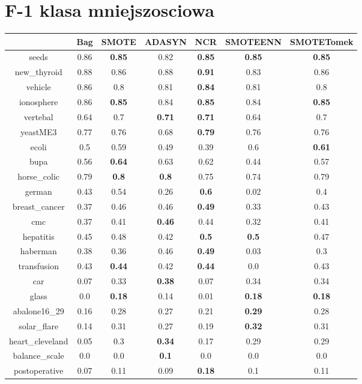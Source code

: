 \documentclass{article}%
\begin{document}
\section*{F{-}1 klasa mniejszosciowa}%
\begin{tabular}{c|cccccc}%
&Bag&SMOTE&ADASYN&NCR&SMOTEENN&SMOTETomek\\%
\hline%
seeds&0.86&\textbf{0.85}&0.82&\textbf{0.85}&\textbf{0.85}&\textbf{0.85}\\%
new\_thyroid&0.88&0.86&0.88&\textbf{0.91}&0.83&0.86\\%
vehicle&0.86&0.8&0.81&\textbf{0.84}&0.81&0.8\\%
ionosphere&0.86&\textbf{0.85}&0.84&\textbf{0.85}&0.84&\textbf{0.85}\\%
vertebal&0.64&0.7&\textbf{0.71}&\textbf{0.71}&0.64&0.7\\%
yeastME3&0.77&0.76&0.68&\textbf{0.79}&0.76&0.76\\%
ecoli&0.5&0.59&0.49&0.39&0.6&\textbf{0.61}\\%
bupa&0.56&\textbf{0.64}&0.63&0.62&0.44&0.57\\%
horse\_colic&0.79&\textbf{0.8}&\textbf{0.8}&0.75&0.74&0.79\\%
german&0.43&0.54&0.26&\textbf{0.6}&0.02&0.4\\%
breast\_cancer&0.37&0.46&0.46&\textbf{0.49}&0.33&0.43\\%
cmc&0.37&0.41&\textbf{0.46}&0.44&0.32&0.41\\%
hepatitis&0.45&0.48&0.42&\textbf{0.5}&\textbf{0.5}&0.47\\%
haberman&0.38&0.36&0.46&\textbf{0.49}&0.03&0.3\\%
transfusion&0.43&\textbf{0.44}&0.42&\textbf{0.44}&0.0&0.43\\%
car&0.07&0.33&\textbf{0.38}&0.07&0.34&0.34\\%
glass&0.0&\textbf{0.18}&0.14&0.01&\textbf{0.18}&\textbf{0.18}\\%
abalone16\_29&0.16&0.28&0.27&0.21&\textbf{0.29}&0.28\\%
solar\_flare&0.14&0.31&0.27&0.19&\textbf{0.32}&0.31\\%
heart\_cleveland&0.05&0.3&\textbf{0.34}&0.17&0.29&0.29\\%
balance\_scale&0.0&0.0&\textbf{0.1}&0.0&0.0&0.0\\%
postoperative&0.07&0.11&0.09&\textbf{0.18}&0.1&0.11\\%
\end{tabular}

%
\end{document}
